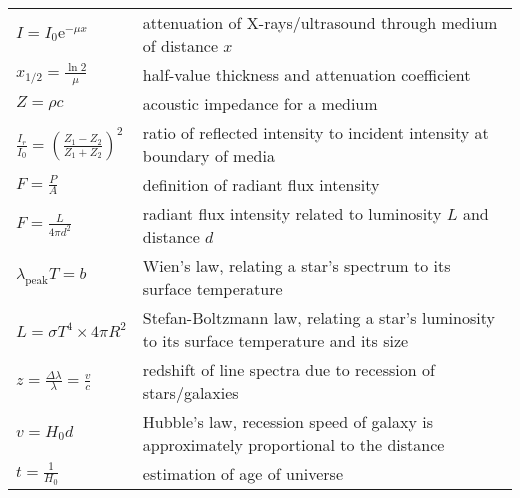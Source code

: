{{\begin{longtable}{p{} p{}}
	$I=I_0\mathrm{e}^{-\mu x}$ & attenuation of X-rays/ultrasound through medium of distance $x$ \\
	$x_{1/2}=\frac{\ln2}{\mu}$ & half-value thickness and attenuation coefficient \\
	$Z=\rho c$ & acoustic impedance for a medium \\
	$\frac{I_r}{I_0} = \left(\frac{Z_1-Z_2}{Z_1+Z_2}\right)^2$ & ratio of reflected intensity to incident intensity at boundary of media \\
	$F = \frac{P}{A}$ & definition of radiant flux intensity \\
	$F = \frac{L}{4\pi d^2}$ & radiant flux intensity related to luminosity $L$ and distance $d$\\
	$\lambda_\text{peak} T = b$ & Wien's law, relating a star's spectrum to its surface temperature \\
	$L = \sigma T^4 \times 4\pi R^2 $ & Stefan-Boltzmann law, relating a star's luminosity to its surface temperature and its size\\
	$z = \frac{\Delta \lambda}{\lambda} = \frac{v}{c}$ & redshift of line spectra due to recession of stars/galaxies \\
	$v = H_0 d$ & Hubble's law, recession speed of galaxy is approximately proportional to the distance\\
	$t = \frac{1}{H_0}$ & estimation of age of universe
	
\end{longtable} 

}\par}